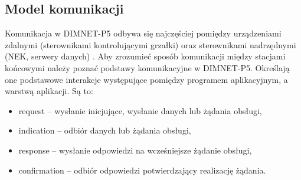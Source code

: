 \subsection{Model komunikacji}
Komunikacja w DIMNET-P5 odbywa się najczęściej pomiędzy urządzeniami zdalnymi (sterownikami kontrolującymi grzałki) oraz sterownikami nadrzędnymi (NEK, serwery danych) \cite{dimnetp5-spec}. Aby zrozumieć sposób komunikacji między stacjami końcowymi należy poznać podstawy komunikacyjne w DIMNET-P5. Określają one podstawowe interakcje występujące pomiędzy programem aplikacyjnym, a warstwą aplikacji. Są to:
\begin{itemize}
\item request -- wysłanie inicjujące, wysłanie danych lub żądania obsługi,
\item indication -- odbiór danych lub żądania obsługi,
\item response -- wysłanie odpowiedzi na wcześniejsze żądanie obsługi,
\item confirmation -- odbiór odpowiedzi potwierdzający realizację żądania.
\end{itemize}


